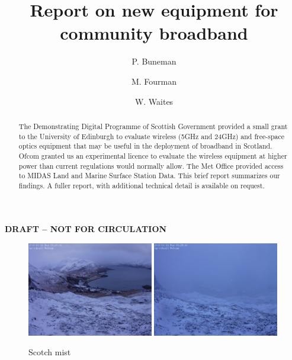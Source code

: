\documentclass{amsart}
\title{Report on new equipment for community broadband}
\author{P. Buneman \and M. Fourman \and W. Waites}
\begin{document}
\begin{center}
  {\Huge\textbf{\color{red}DRAFT -- NOT FOR CIRCULATION}}
\end{center}
\maketitle
\tableofcontents
\listoffigures

\newpage

\begin{figure}[h]
  \begin{center}
    \includegraphics[width=0.49\textwidth]{sgritheall-clear.jpg}%
    \hfill%
    \includegraphics[width=0.49\textwidth]{sgritheall-cloudy.jpg}
  \end{center}
\label{fig-cloudy}
\caption{Scotch mist}
\end{figure}
\begin{abstract}
The Demonstrating Digital Programme of Scottish Government provided a small grant to the
University of Edinburgh to evaluate wireless (5GHz and 24GHz) and free-space optics equipment that may be useful in the
deployment of broadband in Scotland.   Ofcom
granted us an experimental licence to evaluate the
wireless equipment at
higher
power than current regulations would normally allow. The Met Office
provided access to MIDAS Land and Marine Surface Station Data. This brief report summarizes our
findings. A fuller report, with additional technical detail is
available on request.
\end{abstract}
\end{document}

